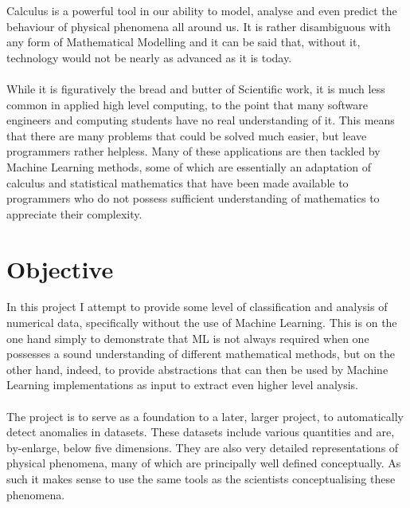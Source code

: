 \documentclass[main.tex]{subfiles}
\begin{document}
  
  Calculus is a powerful tool in our ability to model, analyse and even predict the behaviour of physical phenomena all around us. It is rather disambiguous with any form of Mathematical Modelling and it can be said that, without it, technology would not be nearly as advanced as it is today.
  \\\\
  While it is figuratively the bread and butter of Scientific work, it is much less common in applied high level computing, to the point that many software engineers and computing students have no real understanding of it. This means that there are many problems that could be solved much easier, but leave programmers rather helpless. Many of these applications are then tackled by Machine Learning methods, some of which are essentially an adaptation of calculus and statistical mathematics that have been made available to programmers who do not possess sufficient understanding of mathematics to appreciate their complexity.

  \section{Objective}
    
    In this project I attempt to provide some level of classification and analysis of numerical data, specifically without the use of Machine Learning. This is on the one hand simply to demonstrate that ML is not always required when one possesses a sound understanding of different mathematical methods, but on the other hand, indeed, to provide abstractions that can then be used by Machine Learning implementations as input to extract even higher level analysis.
    \\\\
    The project is to serve as a foundation to a later, larger project, to automatically detect anomalies in datasets. These datasets include various quantities and are, by-enlarge, below five dimensions. They are also very detailed representations of physical phenomena, many of which are principally well defined conceptually. As such it makes sense to use the same tools as the scientists conceptualising these phenomena. 
    
\end{document}
